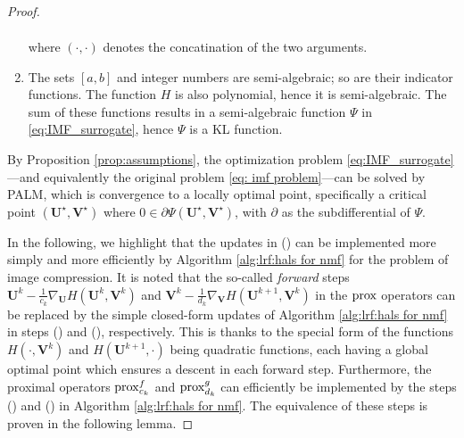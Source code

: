 \begin{proof}
\begin{prop}
\begin{enumerate}
\begin{align}
            \end{align}
            where $(\cdot,\cdot)$ denotes the concatination of the two arguments.
            \item The sets $[a,b]$ and integer numbers are semi-algebraic; so are their indicator functions. The function $H$ is also polynomial, hence it is semi-algebraic. The sum of these functions results in a semi-algebraic function $\Psi$ in \eqref{eq:IMF_surrogate}, hence $\Psi$ is a KL function.
        \end{enumerate}
    \end{prop}
    By Proposition \ref{prop:assumptions}, the optimization problem \eqref{eq:IMF_surrogate}---and equivalently the original problem \eqref{eq: imf problem}---can be solved by PALM, which is convergence to a locally optimal point, specifically a critical point $(\bm U^\star, \bm V^\star)$ where $0 \in \partial \Psi(\bm U^\star, \bm V^\star)$, with $\partial$ as the subdifferential of $\Psi$.

    In the following, we highlight that the updates in () can be implemented more simply and more efficiently by Algorithm \ref{alg:lrf:hals for nmf} for the problem of image compression. It is noted that the so-called \emph{forward} steps $\bm U^k - \frac{1}{c_k} \nabla_{\bm U} H(\bm U^k, \bm V^k)$ and $\bm V^k - \frac{1}{d_k} \nabla_{\bm V} H(\bm U^{k+1}, \bm V^k)$ in the $\operatorname{prox}$ operators can be replaced by the simple closed-form updates of Algorithm \ref{alg:lrf:hals for nmf} in steps () and (), respectively. This is thanks to the special form of the functions $H(\cdot, \bm V^k)$ and $H(\bm U^{k+1}, \cdot)$ being quadratic functions, each having a global optimal point which ensures a descent in each forward step. 
    Furthermore, the proximal operators $\operatorname{prox}^f_{c_k}$ and $\operatorname{prox}^g_{d_k}$ can efficiently be implemented by the steps () and () in Algorithm \ref{alg:lrf:hals for nmf}. The equivalence of these steps is proven in the following lemma.


\end{proof}

